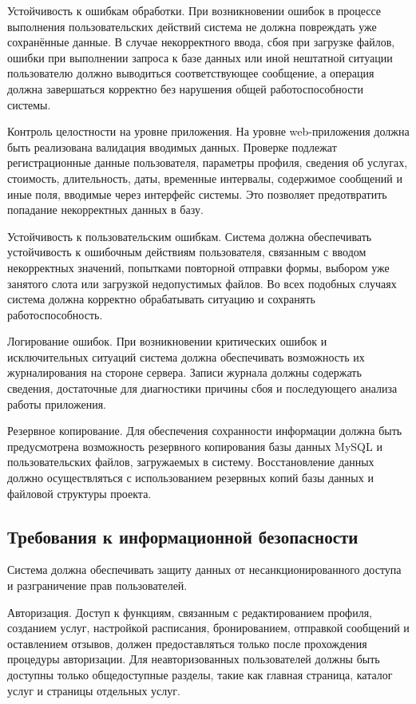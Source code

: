 Устойчивость к ошибкам обработки.  
При возникновении ошибок в процессе выполнения пользовательских действий система не должна повреждать уже сохранённые данные. В случае некорректного ввода, сбоя при загрузке файлов, ошибки при выполнении запроса к базе данных или иной нештатной ситуации пользователю должно выводиться соответствующее сообщение, а операция должна завершаться корректно без нарушения общей работоспособности системы.

Контроль целостности на уровне приложения.  
На уровне web-приложения должна быть реализована валидация вводимых данных. Проверке подлежат регистрационные данные пользователя, параметры профиля, сведения об услугах, стоимость, длительность, даты, временные интервалы, содержимое сообщений и иные поля, вводимые через интерфейс системы. Это позволяет предотвратить попадание некорректных данных в базу.

Устойчивость к пользовательским ошибкам.  
Система должна обеспечивать устойчивость к ошибочным действиям пользователя, связанным с вводом некорректных значений, попытками повторной отправки формы, выбором уже занятого слота или загрузкой недопустимых файлов. Во всех подобных случаях система должна корректно обрабатывать ситуацию и сохранять работоспособность.

Логирование ошибок.  
При возникновении критических ошибок и исключительных ситуаций система должна обеспечивать возможность их журналирования на стороне сервера. Записи журнала должны содержать сведения, достаточные для диагностики причины сбоя и последующего анализа работы приложения.

Резервное копирование.  
Для обеспечения сохранности информации должна быть предусмотрена возможность резервного копирования базы данных MySQL и пользовательских файлов, загружаемых в систему. Восстановление данных должно осуществляться с использованием резервных копий базы данных и файловой структуры проекта.

\subsection{Требования к информационной безопасности}

Система должна обеспечивать защиту данных от несанкционированного доступа и разграничение прав пользователей.

Авторизация.  
Доступ к функциям, связанным с редактированием профиля, созданием услуг, настройкой расписания, бронированием, отправкой сообщений и оставлением отзывов, должен предоставляться только после прохождения процедуры авторизации. Для неавторизованных пользователей должны быть доступны только общедоступные разделы, такие как главная страница, каталог услуг и страницы отдельных услуг.

